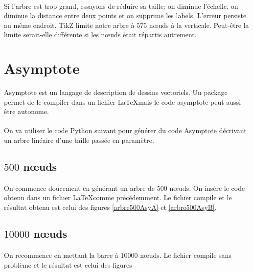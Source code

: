 \paragraph{} Si l'arbre est trop grand, essayons de réduire sa taille: on diminue l'échelle, on diminue la distance entre deux points et on supprime les labels. L'erreur persiste au même endroit. TikZ limite notre arbre à $575$ n\oe uds à la verticale. Peut-être la limite serait-elle différente si les n\oe uds était répartis autrement.

	\section{Asymptote}

\paragraph{}Asymptote est un langage de description de dessins vectoriels. Un package permet de le compiler dans un fichier \LaTeX mais le code asymptote peut aussi être autonome.

\paragraph{}On va utiliser le code Python suivant pour générer du code Asymptote décrivant un arbre linéaire d'une taille passée en paramètre.


		\subsection{$500$ n\oe uds}
		
\paragraph{}On commence doucement en générant un arbre de $500$ n\oe uds. On insère le code obtenu dans un fichier \LaTeX comme précédemment. Le fichier compile et le résultat obtenu est celui des figures \ref{arbre500AsyA} et \ref{arbre500AsyB}.

		\subsection{$10000$ n\oe uds}
\paragraph{}On recommence en mettant la barre à $10000$ n\oe uds. Le fichier compile sans problème et le résultat est celui des figures%
	
